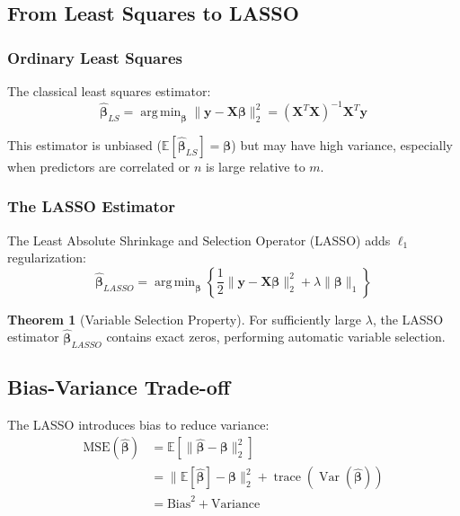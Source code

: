 \documentclass[12pt]{article}
\renewcommand{\vec}[1]{\mathbf{#1}}
\DeclareMathOperator{\Var}{Var}
\DeclareMathOperator{\argmin}{arg\,min}
\DeclareMathOperator{\trace}{trace}
\theoremstyle{definition}
\newtheorem{theorem}{Theorem}[section]
\begin{document}
\subsection{From Least Squares to LASSO}

\subsubsection{Ordinary Least Squares}

The classical least squares estimator:
\begin{equation}
    \hat{\vec{\beta}}_{LS} = \argmin_{\vec{\beta}} \|\vec{y} - \vec{X}\vec{\beta}\|_2^2 = (\vec{X}^T\vec{X})^{-1}\vec{X}^T\vec{y}
    \label{eq:ols}
\end{equation}

This estimator is unbiased ($\mathbb{E}[\hat{\vec{\beta}}_{LS}] = \vec{\beta}$) but may have high variance, especially when predictors are correlated or $n$ is large relative to $m$.

\subsubsection{The LASSO Estimator}

The Least Absolute Shrinkage and Selection Operator (LASSO) adds $\ell_1$ regularization:
\begin{equation}
    \hat{\vec{\beta}}_{LASSO} = \argmin_{\vec{\beta}} \left\{\frac{1}{2}\|\vec{y} - \vec{X}\vec{\beta}\|_2^2 + \lambda\|\vec{\beta}\|_1\right\}
    \label{eq:lasso}
\end{equation}

\begin{theorem}[Variable Selection Property]
    \label{thm:var_selection}
    For sufficiently large $\lambda$, the LASSO estimator $\hat{\vec{\beta}}_{LASSO}$ contains exact zeros, performing automatic variable selection.
\end{theorem}

\subsection{Bias-Variance Trade-off}

The LASSO introduces bias to reduce variance:
\begin{align}
    \text{MSE}(\hat{\vec{\beta}}) & = \mathbb{E}\left[\|\hat{\vec{\beta}} - \vec{\beta}\|_2^2\right]                        \\
                                  & = \|\mathbb{E}[\hat{\vec{\beta}}] - \vec{\beta}\|_2^2 + \trace(\Var(\hat{\vec{\beta}})) \\
                                  & = \text{Bias}^2 + \text{Variance}
\end{align}
\end{document}
